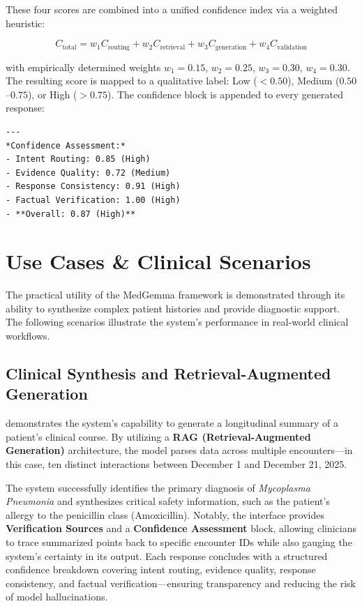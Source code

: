 These four scores are combined into a unified confidence index via a weighted heuristic:

\[
C_{\text{total}} = w_1 C_{\text{routing}} + w_2 C_{\text{retrieval}} + w_3 C_{\text{generation}} + w_4 C_{\text{validation}}
\]

with empirically determined weights $w_1 = 0.15$, $w_2 = 0.25$, $w_3 = 0.30$, $w_4 = 0.30$. The resulting score is mapped to a qualitative label: Low ($<0.50$), Medium ($0.50$--$0.75$), or High ($>0.75$). The confidence block is appended to every generated response:

\begin{verbatim}
---
*Confidence Assessment:*
- Intent Routing: 0.85 (High)
- Evidence Quality: 0.72 (Medium)
- Response Consistency: 0.91 (High)
- Factual Verification: 1.00 (High)
- **Overall: 0.87 (High)**
\end{verbatim}


\section{Use Cases \& Clinical Scenarios}
\label{sec:use_cases}

The practical utility of the MedGemma framework is demonstrated through its ability to synthesize complex patient histories and provide diagnostic support. The following scenarios illustrate the system's performance in real-world clinical workflows.

\subsection{Clinical Synthesis and Retrieval-Augmented Generation}

demonstrates the system's capability to generate a longitudinal summary of a patient's clinical course. By utilizing a \textbf{RAG (Retrieval-Augmented Generation)} architecture, the model parses data across multiple encounters—in this case, ten distinct interactions between December 1 and December 21, 2025. 

The system successfully identifies the primary diagnosis of \textit{Mycoplasma Pneumonia} and synthesizes critical safety information, such as the patient's allergy to the penicillin class (Amoxicillin). Notably, the interface provides \textbf{Verification Sources} and a \textbf{Confidence Assessment} block, allowing clinicians to trace summarized points back to specific encounter IDs while also gauging the system's certainty in its output. Each response concludes with a structured confidence breakdown covering intent routing, evidence quality, response consistency, and factual verification—ensuring transparency and reducing the risk of model hallucinations.

